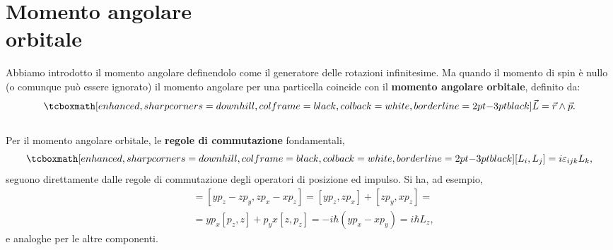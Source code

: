 \chapter[Momento angolare orbitale]{Momento angolare\\ orbitale}
Abbiamo introdotto il momento angolare definendolo come il generatore delle rotazioni infinitesime. Ma quando il momento di spin è nullo (o comunque può essere ignorato) il momento angolare per una particella coincide con il \textbf{momento angolare orbitale}, definito da:
	\begin{equation}
		\tcboxmath[enhanced, sharp corners=downhill, colframe=black, colback=white, borderline={2pt}{-3pt}{black}]{
			\vec{L}=\vec{r}\wedge\vec{p}.
			}
	\end{equation}\\
	
Per il momento angolare orbitale, le \textbf{regole di commutazione} fondamentali,
	\begin{equation}
		\tcboxmath[enhanced, sharp corners=downhill, colframe=black, colback=white, borderline={2pt}{-3pt}{black}]{
			[L_i, L_j]= i \varepsilon _{ijk}L_k ,
			}
	\label{eq:cap17_1}
	\end{equation}
seguono direttamente dalle regole di commutazione degli operatori di posizione ed impulso. Si ha, ad esempio,
	\begin{align}
		[L_x , L_y] &= [y p_z - zp_y, zp_x -xp_z] =  [y p_z , zp_x] + [zp_y, xp_z] = \nonumber \\
		&= yp_x [p_z , z] + p_y x [z , p_z] =   -i\hbar (yp_x -xp_y) = i\hbar L_z ,
	\end{align}
e analoghe per le altre componenti.\\

